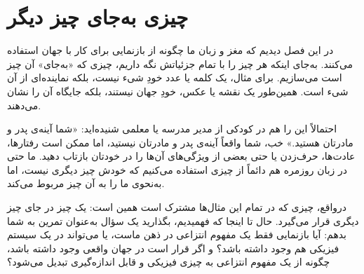 \section{چیزی به‌جای چیز دیگر}
\label{sec:something-in-place-of-another}

در این فصل دیدیم که مغز و زبان ما چگونه از بازنمایی برای کار با جهان استفاده می‌کنند. به‌جای اینکه هر چیز را با تمام جزئیاتش نگه داریم، چیزی که «به‌جای» آن چیز است می‌سازیم. برای مثال، یک کلمه یا عدد خودِ شیء نیست، بلکه نماینده‌ای از آن شیء است. همین‌طور یک نقشه یا عکس، خودِ جهان نیستند، بلکه جایگاه آن را نشان می‌دهند.

احتمالاً این را هم در کودکی از مدیر مدرسه یا معلمی شنیده‌اید: «شما آینه‌ی پدر و مادرتان هستید.» خب، شما واقعاً آینه‌ی پدر و مادرتان نیستید، اما ممکن است رفتارها، عادت‌ها، حرف‌زدن یا حتی بعضی از ویژگی‌های آن‌ها را در خودتان بازتاب دهید. ما حتی در زبان روزمره هم دائماً از چیزی استفاده می‌کنیم که خودش چیز دیگری نیست، اما به‌نحوی ما را به آن چیز مربوط می‌کند.

درواقع، چیزی که در تمام این مثال‌ها مشترک است همین است: یک چیز در جای چیز دیگری قرار می‌گیرد. حال تا اینجا که فهمیدیم، بگذارید یک سؤال به‌عنوان تمرین به شما بدهم: آیا بازنمایی فقط یک مفهوم انتزاعی در ذهن ماست، یا می‌تواند در یک سیستم فیزیکی هم وجود داشته باشد؟ و اگر قرار است در جهان واقعی وجود داشته باشد، چگونه از یک مفهوم انتزاعی به چیزی فیزیکی و قابل اندازه‌گیری تبدیل می‌شود؟